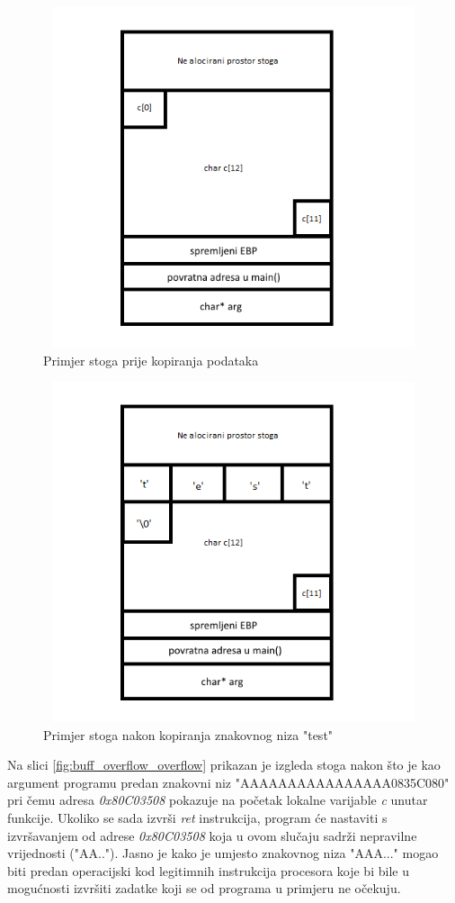 \documentclass[times, utf8, diplomski, numeric]{fer}
\begin{document}
\pagebreak
\begin{figure}[!ht]
\centering
\setlength\fboxsep{0pt}
\setlength\fboxrule{0.5pt}
\includegraphics[width=12cm, height=10cm]{slike/buffer_overflow_nodata}
\caption{Primjer stoga prije kopiranja podataka}
\label{fig:buff_overflow_nodata} 
\end{figure} 

\begin{figure}[!ht]
\centering
\setlength\fboxsep{0pt}
\setlength\fboxrule{0.5pt}
\includegraphics[width=12cm, height=10cm]{slike/buffer_overflow_legitdata}
\caption{Primjer stoga nakon kopiranja znakovnog niza "test"}
\label{fig:buff_overflow_legitdata} 
\end{figure} 
\pagebreak
Na slici \ref{fig:buff_overflow_overflow} prikazan je izgleda stoga nakon što je kao argument programu predan znakovni niz "AAAAAAAAAAAAAAAA0835C080" pri čemu adresa \emph{0x80C03508} pokazuje na početak lokalne varijable \emph{c} unutar funkcije. Ukoliko se sada izvrši \emph{ret} instrukcija, program će nastaviti s izvršavanjem od adrese \emph{0x80C03508} koja u ovom slučaju sadrži nepravilne vrijednosti ("AA.."). Jasno je kako je umjesto znakovnog niza "AAA..." mogao biti predan operacijski kod legitimnih instrukcija procesora koje bi bile u mogućnosti izvršiti zadatke koji se od programa u primjeru ne očekuju.
\end{document}
